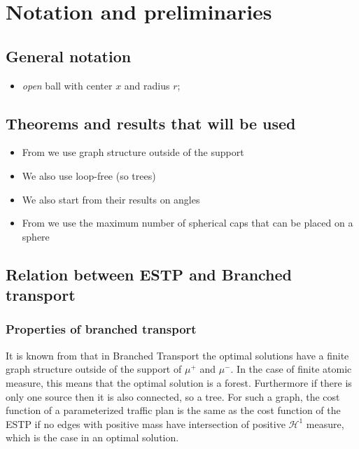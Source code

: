 \documentclass{article}
\newenvironment{itemizeb}
{\begin{itemize}
     \itemsep=2pt}{
\end{itemize}}
\begin{document}
    \section{Notation and preliminaries}

    \subsection{General notation}

    \begin{itemizeb}
         cm=.3 cm

        \item[$B(x,r)$] \emph{open} ball with center $x$ and radius $r$;

    \end{itemizeb}

    \subsection{Theorems and results that will be used}

    \begin{itemize}
        \item From  \cite{Bernot} we use graph structure outside of the support
        \item We also use loop-free (so trees)
        \item We also start from their results on angles
        \item From \cite{Rankin} we use the maximum number of spherical caps that can be placed on a sphere
    \end{itemize}

    \subsection{Relation between ESTP and Branched transport}

    \subsubsection{Properties of branched transport}
    It is known from \cite{Bernot} that in Branched Transport the optimal solutions have a finite graph structure outside of the
    support of $\mu^+$ and $\mu^-$. In the case of finite atomic measure, this means that the optimal solution is a forest. Furthermore
    if there is only one source then it is also connected, so a tree.
    For such a graph, the cost function of a parameterized traffic plan is the same as the cost function of the ESTP if no edges with positive mass
    have intersection of positive $\mathcal{H}^1$ measure, which is the case in an optimal solution.
\end{document}
